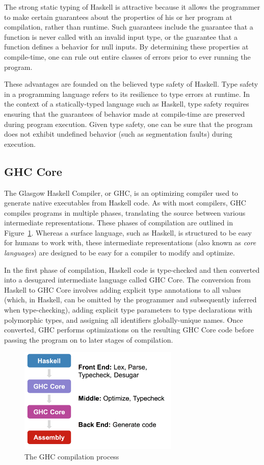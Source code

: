 \documentclass{sig-alternate}
\begin{document}
The strong static typing of Haskell is attractive because it allows the programmer to make certain guarantees about the properties of his or her program at compilation, rather than runtime. Such guarantees include the guarantee that a function is never called with an invalid input type, or the guarantee that a function defines a behavior for null inputs. By determining these properties at compile-time, one can rule out entire classes of errors prior to ever running the program.

These advantages are founded on the believed type safety of Haskell. Type safety in a programming language refers to its resilience to type errors at runtime. In the context of a statically-typed language such as Haskell, type safety requires ensuring that the guarantees of behavior made at compile-time are preserved during program execution. Given type safety, one can be sure that the program does not exhibit undefined behavior (such as segmentation faults) during execution.

\subsection{GHC Core}
\label{sec:background-ghc-core}

The Glasgow Haskell Compiler, or GHC, is an optimizing compiler used to generate native executables from Haskell code. As with most compilers, GHC compiles programs in multiple phases, translating the source between various intermediate representations. These phases of compilation are outlined in Figure~\ref{fig:desgar}. Whereas a surface language, such as Haskell, is structured to be easy for humans to work with, these intermediate representations (also known as {\em core languages}) are designed to be easy for a compiler to modify and optimize.

In the first phase of compilation, Haskell code is type-checked and then converted into a desugared intermediate language called GHC Core. The conversion from Haskell to GHC Core involves adding explicit type annotations to all values (which, in Haskell, can be omitted by the programmer and subsequently inferred when type-checking), adding explicit type parameters to type declarations with polymorphic types, and assigning all identifiers globally-unique names. Once converted, GHC performs optimizations on the resulting GHC Core code before passing the program on to later stages of compilation.

\begin{figure}[h!]
  \centering
  \includegraphics[max width=3in]{desgar.png}
  \caption{The GHC compilation process}
  \label{fig:desgar}
\end{figure}
\end{document}
